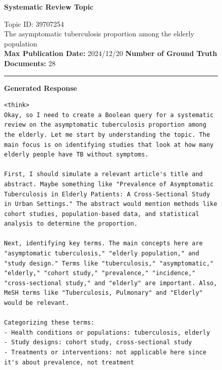 \begin{figure}[p]
	\centering
	
	\begin{CombinedBox}
		\textbf{\small Systematic Review Topic}
		
		\vspace{0.3em}
		{\footnotesize
			Topic ID: 39707254 \\ The asymptomatic tuberculosis proportion among the elderly population
			\\
			\textbf{Max Publication Date:} 2024/12/20 \quad \textbf{Number of Ground Truth Documents:} 28
		}
		
		\vspace{0.5em}
		\hrule
		\vspace{0.5em}
		
		\textbf{\small Generated Response}
		
		\vspace{0.3em}
		\begin{lstlisting}[basicstyle=\ttfamily\scriptsize, breaklines=true, breakatwhitespace=true, showstringspaces=false, columns=fullflexible, keepspaces=true, breakindent=0pt, frame=none, xleftmargin=0pt, xrightmargin=0pt]
<think>
Okay, so I need to create a Boolean query for a systematic review on the asymptomatic tuberculosis proportion among the elderly. Let me start by understanding the topic. The main focus is on identifying studies that look at how many elderly people have TB without symptoms. 

First, I should simulate a relevant article's title and abstract. Maybe something like "Prevalence of Asymptomatic Tuberculosis in Elderly Patients: A Cross-Sectional Study in Urban Settings." The abstract would mention methods like cohort studies, population-based data, and statistical analysis to determine the proportion.

Next, identifying key terms. The main concepts here are "asymptomatic tuberculosis," "elderly population," and "study design." Terms like "tuberculosis," "asymptomatic," "elderly," "cohort study," "prevalence," "incidence," "cross-sectional study," and "elderly" are important. Also, MeSH terms like "Tuberculosis, Pulmonary" and "Elderly" would be relevant.

Categorizing these terms: 
- Health conditions or populations: tuberculosis, elderly
- Study designs: cohort study, cross-sectional study
- Treatments or interventions: not applicable here since it's about prevalence, not treatment


\end{lstlisting}
\end{CombinedBox}
\end{figure}
